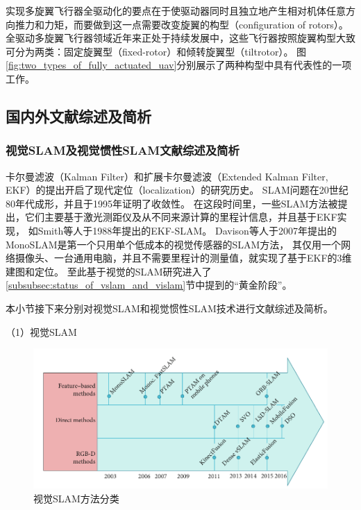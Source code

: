 实现多旋翼飞行器全驱动化的要点在于使驱动器同时且独立地产生相对机体任意方向推力和力矩，而要做到这一点需要改变旋翼的构型（configuration of rotors）。
全驱动多旋翼飞行器领域近年来正处于持续发展中，这些飞行器按照旋翼构型大致可分为两类：固定旋翼型（fixed-rotor）\cite{brescianini2016design, park2018odar,allenspach2020design}和倾转旋翼型（tiltrotor）\cite{ryll2014novel, kamel2018voliro}。
图\ref{fig:two_types_of_fully_actuated_uav}分别展示了两种构型中具有代表性的一项工作。

\subsection{国内外文献综述及简析}
\subsubsection{视觉SLAM及视觉惯性SLAM文献综述及简析}
卡尔曼滤波（Kalman Filter）\cite{kalman1960new}和扩展卡尔曼滤波（Extended Kalman Filter, EKF）\cite{maybeck1982stochastic}的提出开启了现代定位（localization）的研究历史。
SLAM问题在20世纪80年代成形，并且于1995年证明了收敛性\cite{durrant1988uncertain,leonard1991simultaneous,smith1986representation}。
在这段时间里，一些SLAM方法被提出，它们主要基于激光测距仪及从不同来源计算的里程计信息，并且基于EKF实现，
如Smith等人于1988年提出的EKF-SLAM\cite{cheeseman1987stochastic}。
Davison等人于2007年提出的MonoSLAM\cite{davison2007monoslam}是第一个只用单个低成本的视觉传感器的SLAM方法，
其仅用一个网络摄像头、一台通用电脑，并且不需要里程计的测量值，就实现了基于EKF的3维建图和定位。
至此基于视觉的SLAM研究进入了\ref{subsubsec:status_of_vslam_and_vislam}节中提到的“黄金阶段”。

本小节接下来分别对视觉SLAM和视觉惯性SLAM技术进行文献综述及简析。

（1）视觉SLAM

\begin{figure}[htbp]
    \centering
    \includegraphics[width = \textwidth]{figures/vslam_classification.png}
    \caption{视觉SLAM方法分类\cite{servieres2021visual}}
    \label{fig:vslam_classification}
\end{figure}

